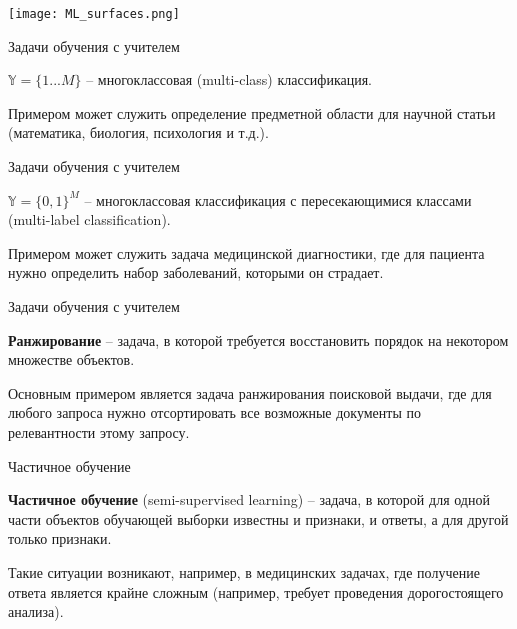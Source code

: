 \documentclass[pdf, intlimits, 9pt, unicode]{beamer}
\begin{document}
\begin{frame}
\begin{center}\texttt{[image: ML\_surfaces.png]}\end{center}
\end{frame}




\begin{frame}{Задачи обучения с учителем}

$\mathbb{Y} = \{1 ... M\}$ -- многоклассовая (multi-class) классификация.
\bigskip

Примером может служить определение предметной области для научной статьи (математика, биология, психология и т.д.).
\end{frame}






\begin{frame}{Задачи обучения с учителем}

$\mathbb{Y} = \{0,1\}^M$ -- многоклассовая классификация с пересекающимися классами (multi-label classification).
\bigskip

Примером может служить задача медицинской диагностики, где для пациента нужно определить набор заболеваний, которыми он страдает.
\end{frame}





\begin{frame}{Задачи обучения с учителем}

\textbf{Ранжирование} -- задача, в которой требуется восстановить порядок на некотором множестве объектов.
\bigskip

Основным примером является задача ранжирования поисковой выдачи, где для любого запроса нужно отсортировать все возможные документы по релевантности этому запросу.
\end{frame}







\begin{frame}{Частичное обучение}

\textbf{Частичное обучение} (semi-supervised learning) -- задача, в которой для одной части объектов обучающей выборки известны и признаки, и ответы, а для другой только признаки.
\bigskip

Такие ситуации возникают, например, в медицинских задачах, где получение ответа является крайне сложным (например, требует проведения дорогостоящего анализа).
\end{frame}
\end{document}

